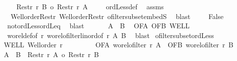 \begin{isabellebody}
\ \ \ \isamarkupfalse%
\ {\isachardoublequoteopen}Restr\ r\ B\ {\isacharless}{\kern0pt}o\ Restr\ r\ A{\isachardoublequoteclose}\isanewline
\ \ \ \isamarkupfalse%
\ ordLess{\isacharunderscore}{\kern0pt}def\ \isamarkupfalse%
\ assms\isanewline
\ \ \ Well{\isacharunderscore}{\kern0pt}order{\isacharunderscore}{\kern0pt}Restr\ Well{\isacharunderscore}{\kern0pt}order{\isacharunderscore}{\kern0pt}Restr\ ofilter{\isacharunderscore}{\kern0pt}subset{\isacharunderscore}{\kern0pt}embedS\ \isamarkupfalse%
\ blast\isanewline
\ \ \ \isamarkupfalse%
\ False\ \isamarkupfalse%
\ {\isacharasterisk}{\kern0pt}\ not{\isacharunderscore}{\kern0pt}ordLess{\isacharunderscore}{\kern0pt}ordLeq\ \isamarkupfalse%
\ blast\isanewline
\ \ \isacommand{{\isacharbraceright}{\kern0pt}}\isamarkupfalse%
\isanewline
\ \ \isamarkupfalse%
\ {\isachardoublequoteopen}A\ {\isasymle}\ B{\isachardoublequoteclose}\ \isamarkupfalse%
\ OFA\ OFB\ WELL\isanewline
\ \ wo{\isacharunderscore}{\kern0pt}rel{\isacharunderscore}{\kern0pt}def{\isacharbrackleft}{\kern0pt}of\ r{\isacharbrackright}{\kern0pt}\ wo{\isacharunderscore}{\kern0pt}rel{\isachardot}{\kern0pt}ofilter{\isacharunderscore}{\kern0pt}linord{\isacharbrackleft}{\kern0pt}of\ r\ A\ B{\isacharbrackright}{\kern0pt}\ \isamarkupfalse%
\ blast\isanewline
{}\isamarkupfalse%
%
\endisatagproof
{\isafoldproof}%
%
\isadelimproof
\isanewline
%
\endisadelimproof
\isanewline
{}\isamarkupfalse%
\ ofilter{\isacharunderscore}{\kern0pt}subset{\isacharunderscore}{\kern0pt}ordLess{\isacharcolon}{\kern0pt}\isanewline
{}\ WELL{\isacharcolon}{\kern0pt}\ {\isachardoublequoteopen}Well{\isacharunderscore}{\kern0pt}order\ r{\isachardoublequoteclose}\ \isanewline
\ \ \ \ \ \ \ \ OFA{\isacharcolon}{\kern0pt}\ {\isachardoublequoteopen}wo{\isacharunderscore}{\kern0pt}rel{\isachardot}{\kern0pt}ofilter\ r\ A{\isachardoublequoteclose}\ \ OFB{\isacharcolon}{\kern0pt}\ {\isachardoublequoteopen}wo{\isacharunderscore}{\kern0pt}rel{\isachardot}{\kern0pt}ofilter\ r\ B{\isachardoublequoteclose}\isanewline
{}\ {\isachardoublequoteopen}{\isacharparenleft}{\kern0pt}A\ {\isacharless}{\kern0pt}\ B{\isacharparenright}{\kern0pt}\ {\isacharequal}{\kern0pt}\ {\isacharparenleft}{\kern0pt}Restr\ r\ A\ {\isacharless}{\kern0pt}o\ Restr\ r\ B{\isacharparenright}{\kern0pt}{\isachardoublequoteclose}\isanewline
%
\isadelimproof
%
\endisadelimproof

\end{isabellebody}
